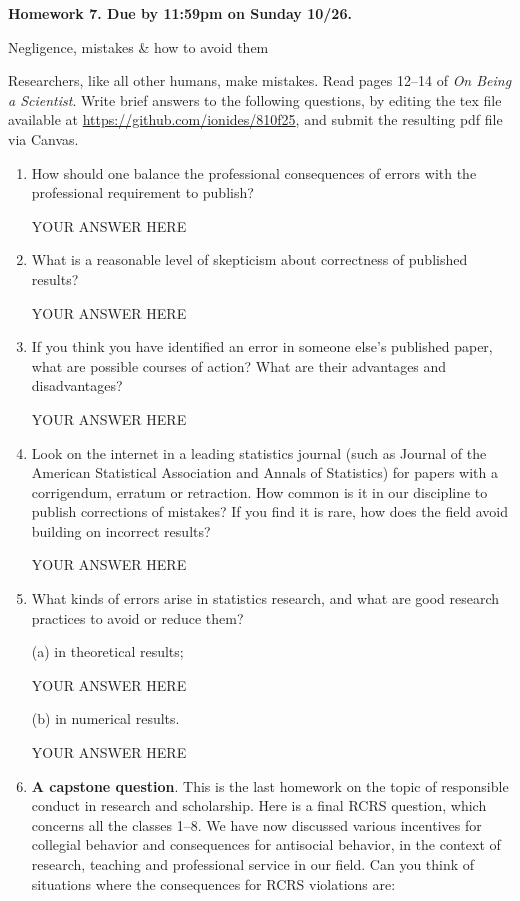 \documentclass[12pt]{article}
\begin{document}
\begin{center}\bf
Homework 7. Due by 11:59pm on Sunday 10/26.

Negligence, mistakes \& how to avoid them

\end{center}
Researchers, like all other humans, make mistakes. Read pages 12--14 of {\em On Being a Scientist}.  Write brief answers to the following questions, by editing the tex file available at \url{https://github.com/ionides/810f25}, and submit the resulting pdf file via Canvas.

\begin{enumerate}

\item How should one balance the professional consequences of errors with the professional requirement to publish?
  
YOUR ANSWER HERE

\item What is a reasonable level of skepticism about correctness of published results?

YOUR ANSWER HERE
  
\item If you think you have identified an error in someone else's published paper, what are possible courses of action? What are their advantages and disadvantages?

YOUR ANSWER HERE

\item Look on the internet in a leading statistics journal (such as Journal of the American Statistical Association and Annals of Statistics) for papers with a corrigendum, erratum or retraction. How common is it in our discipline to publish corrections of mistakes? If you find it is rare, how does the field avoid building on incorrect results?

YOUR ANSWER HERE

\item What kinds of errors arise in statistics research, and what are good research practices to avoid or reduce them?

(a) in theoretical results;

YOUR ANSWER HERE
    
(b) in numerical results.

YOUR ANSWER HERE

\item {\bf A capstone question}. This is the last homework on the topic of responsible conduct in research and scholarship.  Here is a final RCRS question, which concerns all the classes 1--8. We have now discussed various incentives for collegial behavior and consequences for antisocial behavior, in the context of research, teaching and professional service in our field. Can you think of situations where the consequences for RCRS violations are:


\end{enumerate}
\end{document}
